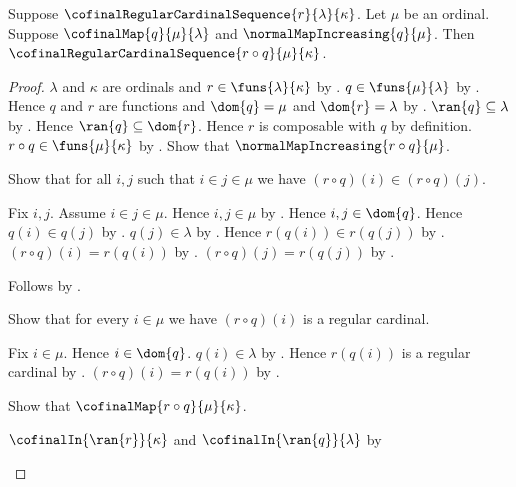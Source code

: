 \begin{theorem}\label{cofinal_regular_sequence_reindex}
    Suppose $\cofinalRegularCardinalSequence{r}{\lambda}{\kappa}$.
    Let $\mu$ be an ordinal.
    Suppose $\cofinalMap{q}{\mu}{\lambda}$ and
        $\normalMapIncreasing{q}{\mu}$.
    Then
        $\cofinalRegularCardinalSequence{r\circ q}{\mu}{\kappa}$.
\end{theorem}
\begin{proof}
    $\lambda$ and $\kappa$ are ordinals and
        $r\in\funs{\lambda}{\kappa}$ by
        .
    $q\in\funs{\mu}{\lambda}$ by .
    Hence $q$ and $r$ are functions and
        $\dom{q}=\mu$ and $\dom{r}=\lambda$ by
        .
    $\ran{q}\subseteq\lambda$ by .
    Hence $\ran{q}\subseteq\dom{r}$.
    Hence $r$ is composable with $q$ by definition.
    $r\circ q\in\funs{\mu}{\kappa}$ by .
    Show that $\normalMapIncreasing{r\circ q}{\mu}$.
    \begin{subproof}
        Show that for all $i,j$ such that $i\in j\in\mu$ we have
            $(r\circ q)(i)\in(r\circ q)(j)$.
        \begin{subproof}
            Fix $i,j$.
            Assume $i\in j\in\mu$.
            Hence $i,j\in\mu$ by .
            Hence $i,j\in\dom{q}$.
            Hence $q(i)\in q(j)$ by .
            $q(j)\in\lambda$ by .
            Hence $r(q(i))\in r(q(j))$ by
                .
            $(r\circ q)(i)=r(q(i))$ by .
            $(r\circ q)(j)=r(q(j))$ by .
        \end{subproof}
        Follows by .
    \end{subproof}
    Show that for every $i\in\mu$ we have
        $(r\circ q)(i)$ is a regular cardinal.
    \begin{subproof}
        Fix $i\in\mu$.
        Hence $i\in\dom{q}$.
        $q(i)\in\lambda$ by .
        Hence $r(q(i))$ is a regular cardinal by
            .
        $(r\circ q)(i)=r(q(i))$ by .
    \end{subproof}
    Show that $\cofinalMap{r\circ q}{\mu}{\kappa}$.
    \begin{subproof}
        $\cofinalIn{\ran{r}}{\kappa}$ and
            $\cofinalIn{\ran{q}}{\lambda}$ by

\end{subproof}
\end{proof}
